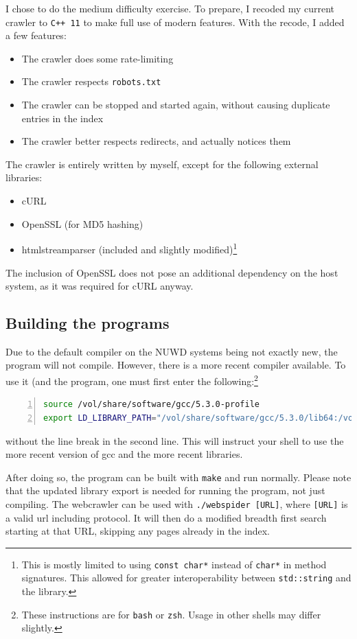 \documentclass[12pt,a4paper]{article}
\begin{document}
I chose to do the medium difficulty exercise. To prepare, I recoded my current crawler to \texttt{C++ 11} to make full use of modern features. With the recode, I added a few features:
\begin{itemize}
	\item The crawler does some rate-limiting
	\item The crawler respects \texttt{robots.txt}
	\item The crawler can be stopped and started again, without causing duplicate entries in the index
	\item The crawler better respects redirects, and actually notices them
\end{itemize}
The crawler is entirely written by myself, except for the following external libraries:
\begin{itemize}
	\item cURL
	\item OpenSSL (for MD5 hashing)
	\item htmlstreamparser (included and slightly modified)\footnote{This is mostly limited to using \texttt{const char*} instead of \texttt{char*} in method signatures. This allowed for greater interoperability between \texttt{std::string} and the library.}
\end{itemize}
The inclusion of OpenSSL does not pose an additional dependency on the host system, as it was required for cURL anyway.

\subsection{Building the programs}

Due to the default compiler on the NUWD systems being not exactly new, the program will not compile. However, there is a more recent compiler available. To use it (and the program, one must first enter the following:\footnote{These instructions are for \texttt{bash} or \texttt{zsh}. Usage in other shells may differ slightly.}

\begin{lstlisting}[breaklines,numbers=left,language=bash]
source /vol/share/software/gcc/5.3.0-profile
export LD_LIBRARY_PATH="/vol/share/software/gcc/5.3.0/lib64:/vol/share/software/gcc/5.3.0/lib32:$LD_LIBRARY_PATH"
\end{lstlisting}
without the line break in the second line. This will instruct your shell to use the more recent version of gcc and the more recent libraries.

After doing so, the program can be built with \texttt{make} and run normally. Please note that the updated library export is needed for running the program, not just compiling. The webcrawler can be used with \texttt{./webspider [URL]}, where \texttt{[URL]} is a valid url including protocol. It will then do a modified breadth first search starting at that URL, skipping any pages already in the index.
\end{document}

